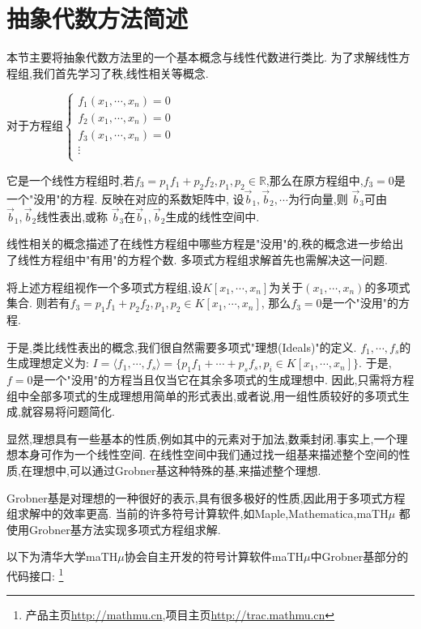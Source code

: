 \section{抽象代数方法简述}
	本节主要将抽象代数方法里的一个基本概念与线性代数进行类比.
	为了求解线性方程组,我们首先学习了秩,线性相关等概念.

	对于方程组$ \begin{cases}
		f_1(x_1,\cdots,x_n)=0\\
		f_2(x_1,\cdots,x_n)=0\\
		f_3(x_1,\cdots,x_n)=0\\
		\vdots\\
	\end{cases}$
	
	它是一个线性方程组时,若$ f_3=p_1f_1+p_2f_2,p_1,p_2\in \mathbb{R}$,那么在原方程组中,$ f_3=0$是一个"没用"的方程.
	反映在对应的系数矩阵中,
	设$ \overrightarrow b_1,\overrightarrow b_2,\cdots $为行向量,则
	$ \overrightarrow b_3$可由$ \overrightarrow b_1,\overrightarrow b_2$线性表出,或称
	$ \overrightarrow b_3$在$ \overrightarrow b_1,\overrightarrow b_2$生成的线性空间中.

	线性相关的概念描述了在线性方程组中哪些方程是"没用"的,秩的概念进一步给出了线性方程组中"有用"的方程个数.
	多项式方程组求解首先也需解决这一问题.

	将上述方程组视作一个多项式方程组,设$ K[x_1,\cdots, x_n]$为关于$ (x_1,\cdots , x_n)$的多项式集合.
	则若有$ f_3 = p_1f_1 + p_2f_2,p_1,p_2\in K[x_1,\cdots, x_n]$,
	那么$ f_3=0$是一个"没用"的方程.

	于是,类比线性表出的概念,我们很自然需要多项式"理想(Ideals)"的定义.
	$ f_1,\cdots,f_s $的生成理想定义为: 
	$ I=\langle f_1,\cdots,f_s \rangle = \{p_1f_1+\cdots+p_sf_s,p_i\in K[x_1,\cdots,x_n]\}$.
	于是,$ f=0$是一个"没用"的方程当且仅当它在其余多项式的生成理想中.
	因此,只需将方程组中全部多项式的生成理想用简单的形式表出,或者说,用一组性质较好的多项式生成,就容易将问题简化.

	显然,理想具有一些基本的性质,例如其中的元素对于加法,数乘封闭.事实上,一个理想本身可作为一个线性空间.
	在线性空间中我们通过找一组基来描述整个空间的性质,在理想中,可以通过Grobner基这种特殊的基,来描述整个理想.

	Grobner基是对理想的一种很好的表示,具有很多极好的性质,因此用于多项式方程组求解中的效率更高.
	当前的许多符号计算软件,如Maple,Mathematica,maTH$ \mu$ 都使用Grobner基方法实现多项式方程组求解.

	以下为清华大学maTH$ \mu$协会自主开发的符号计算软件maTH$ \mu$中Grobner基部分的代码接口:
	\footnote{产品主页\url{http://mathmu.cn},项目主页\url{http://trac.mathmu.cn}}


